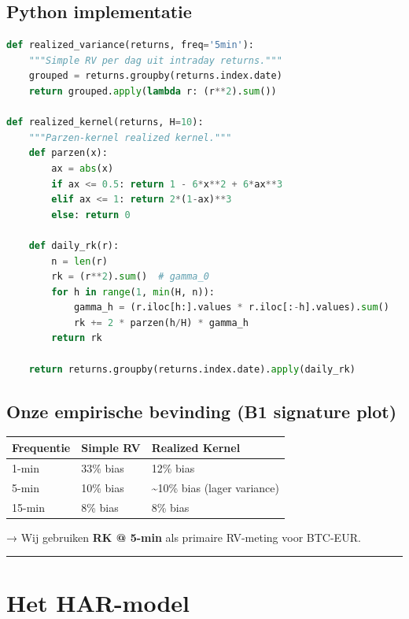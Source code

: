 \hypertarget{python-implementatie}{%
\subsection{Python implementatie}\label{python-implementatie}}

\begin{lstlisting}[language=Python]
def realized_variance(returns, freq='5min'):
    """Simple RV per dag uit intraday returns."""
    grouped = returns.groupby(returns.index.date)
    return grouped.apply(lambda r: (r**2).sum())

def realized_kernel(returns, H=10):
    """Parzen-kernel realized kernel."""
    def parzen(x):
        ax = abs(x)
        if ax <= 0.5: return 1 - 6*x**2 + 6*ax**3
        elif ax <= 1: return 2*(1-ax)**3
        else: return 0
    
    def daily_rk(r):
        n = len(r)
        rk = (r**2).sum()  # gamma_0
        for h in range(1, min(H, n)):
            gamma_h = (r.iloc[h:].values * r.iloc[:-h].values).sum()
            rk += 2 * parzen(h/H) * gamma_h
        return rk
    
    return returns.groupby(returns.index.date).apply(daily_rk)
\end{lstlisting}

\hypertarget{onze-empirische-bevinding-b1-signature-plot}{%
\subsection{Onze empirische bevinding (B1 signature plot)}\label{onze-empirische-bevinding-b1-signature-plot}}

\begin{longtable}[]{@{}lll@{}}
\toprule
Frequentie & Simple RV & Realized Kernel \\
\midrule
\endhead
1-min & 33\% bias & 12\% bias \\
5-min & 10\% bias & \textasciitilde10\% bias (lager variance) \\
15-min & 8\% bias & 8\% bias \\
\bottomrule
\end{longtable}

→ Wij gebruiken \textbf{RK @ 5-min} als primaire RV-meting voor BTC-EUR.

\begin{center}\rule{0.5\linewidth}{0.5pt}\end{center}

\hypertarget{het-har-model}{%
\section{Het HAR-model}\label{het-har-model}}

